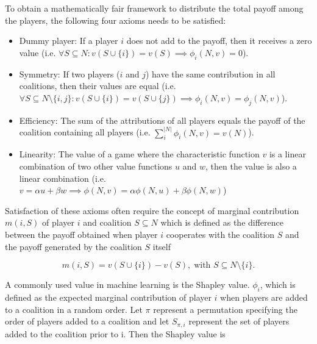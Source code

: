To obtain a mathematically fair framework to distribute the total payoff among 
the players, the following four axioms needs to be satisfied: \cite{merrick2020explanation, shapley1953value}


\begin{itemize}
	\item Dummy player: If a player $i$ does not add to the payoff, then it receives a
	      zero value (i.e. $\forall S \subseteq N: v(S \cup \{i\}) = v(S) \implies \phi_i(N, v) = 0$).

	\item Symmetry: If two players ($i$ and $j$) have the same contribution in all coalitions, then
	      their values are equal (i.e. $\forall S \subseteq N \setminus \{i, j\}: v(S \cup \{i\}) = v(S \cup \{j\}) \implies \phi_i(N, v) = \phi_j(N, v)$).

	\item Efficiency: The sum of the attributions of all players equals the payoff of the coalition containing
	      all players (i.e. $\sum^{|N|}_i \phi_i(N, v) = v(N)$).

	\item Linearity: The value of a game where the characteristic function $v$ is a linear combination of
	      two other value functions $u$ and $w$, then the value is also a linear combination (i.e.
	      $v = \alpha u + \beta w \implies \phi(N, v) = \alpha \phi(N, u) + \beta \phi(N, w)$)
\end{itemize}


Satisfaction of these axioms often require the concept of marginal contribution $m(i, S)$ 
of player $i$ and coalition $S \subseteq N$ which is defined as the 
difference between the payoff obtained when player $i$ cooperates with the coalition 
$S$ and the payoff generated by the coalition $S$ itself\cite{shapley1953value}


\begin{equation}
	m(i, S) = v\left(S \cup \{i\}\right) - v\left(S\right), \; \text{with } S \subseteq N \setminus \{i\}.
\end{equation}


A commonly used value in machine learning is the Shapley value.
$\phi_i$, which is defined as the expected marginal 
contribution of player $i$ when players are added to a coalition in a 
random order. Let $\pi$ represent a permutation specifying the order 
of players added to a coalition and let $S_{\pi, i}$ represent the set of players 
added to the coalition prior to i. Then the Shapley value is\cite{merrick2020explanation} 


